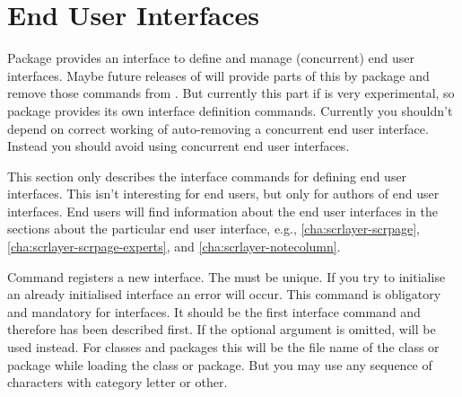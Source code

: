 \section{End User Interfaces}
\label{sec:scrlayer.enduserinterfaces}

Package  provides an interface to define and manage
(concurrent) end user interfaces. Maybe future releases of \KOMAScript{} will
provide parts of this by package  and remove those commands
from . But currently this part if  is very
experimental, so package  provides its own interface
definition commands. Currently you shouldn't depend on correct working of
auto-removing a concurrent end user interface. Instead you should avoid using
concurrent end user interfaces.

This section only describes the interface commands for defining end user
interfaces. This isn't interesting for end users, but only for authors of end
user interfaces. End users will find information about the end user interfaces
in the sections about the particular end user interface, e.g.,
\autoref{cha:scrlayer-scrpage}, \autoref{cha:scrlayer-scrpage-experts}, and
\autoref{cha:scrlayer-notecolumn}.

\begin{Declaration}
\end{Declaration}
%
Command 
registers a new interface. The  must be unique. If you
try to initialise an already initialised interface an error will occur. This
command is obligatory and mandatory for interfaces. It should be the first
interface command and therefore has been described first. If the optional
argument is omitted,  will be
used instead. For classes and packages this will be the file name of the class
or package while loading the class or package. But you may use any sequence of
characters with category letter or other.%

